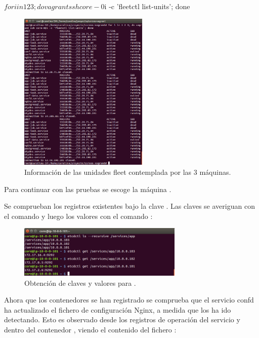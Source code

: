 \begin{code}
$ for i in 1 2 3; do vagrant ssh core-0$i -c 'fleetctl list-units'; done
\end{code}

\begin{figure}[H]
\centering
\includegraphics[width=0.55\textwidth]{images/figures/units-confd.png}
\caption{Información de las unidades fleet contemplada por las 3 máquinas.}
\end{figure}

Para continuar con las pruebas se escoge la máquina .

Se comprueban los registros existentes bajo la clave . Las claves se averiguan con el comando  y luego los valores con el comando :

\begin{figure}[H]
\centering
\includegraphics[width=0.7\textwidth]{images/figures/recursive-confd.png}
\caption{Obtención de claves y valores para .}
\end{figure}

Ahora que los contenedores  se han registrado se comprueba que el servicio confd ha actualizado el fichero de configuración Nginx, a medida que los ha ido detectando. Esto es observado desde los registros de operación del servicio  y dentro del contenedor , viendo el contenido del fichero :

